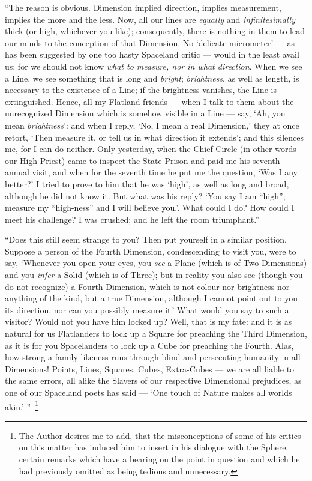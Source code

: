 \documentclass[10pt, kindle, oneside]{kindle}
\begin{document}
``The reason is obvious. Dimension implied direction, implies measurement,
implies the more and the less. Now, all our lines are \emph{equally} and
\emph{infinitesimally} thick (or high, whichever you like); consequently, there is
nothing in them to lead our minds to the conception of that Dimension. No
`delicate micrometer' --- as has been suggested by one too hasty Spaceland
critic --- would in the least avail us; for we should not know \emph{what to measure,
nor in what direction}. When we see a Line, we see something that is long and
\emph{bright}; \emph{brightness}, as well as length, is necessary to the existence of a
Line; if the brightness vanishes, the Line is extinguished. Hence, all my
Flatland friends --- when I talk to them about the unrecognized Dimension which
is somehow visible in a Line --- say, `Ah, you mean \emph{brightness}': and when I
reply, `No, I mean a real Dimension,' they at once retort, `Then measure it,
or tell us in what direction it extends'; and this silences me, for I can do
neither. Only yesterday, when the Chief Circle (in other words our High
Priest) came to inspect the State Prison and paid me his seventh annual visit,
and when for the seventh time he put me the question, `Was I any better?' I
tried to prove to him that he was `high', as well as long and broad, although
he did not know it. But what was his reply? `You say I am ``high''; measure my
``high-ness'' and I will believe you.'. What could I do? How could I meet his
challenge? I was crushed; and he left the room triumphant.''

``Does this still seem strange to you? Then put yourself in a similar position.
Suppose a person of the Fourth Dimension, condescending to visit you, were to
say, `Whenever you open your eyes, you \emph{see} a Plane (which is of Two
Dimensions) and you \emph{infer} a Solid (which is of Three); but in reality you also
see (though you do not recognize) a Fourth Dimension, which is not colour nor
brightness nor anything of the kind, but a true Dimension, although I cannot
point out to you its direction, nor can you possibly measure it.' What would
you say to such a visitor? Would not you have him locked up? Well, that is my
fate: and it is as natural for us Flatlanders to lock up a Square for
preaching the Third Dimension, as it is for you Spacelanders to lock up a Cube
for preaching the Fourth. Alas, how strong a family likeness runs through
blind and persecuting humanity in all Dimensions! Points, Lines, Squares,
Cubes, Extra-Cubes --- we are all liable to the same errors, all alike the
Slavers of our respective Dimensional prejudices, as one of our Spaceland
poets has said --- `One touch of Nature makes all worlds akin.' ''~\footnote{The
Author desires me to add, that the misconceptions of some of his critics on
this matter has induced him to insert in his dialogue with
the Sphere, certain remarks which have a bearing on the point in question and
which he had previously omitted as being tedious and unnecessary.}
\end{document}
